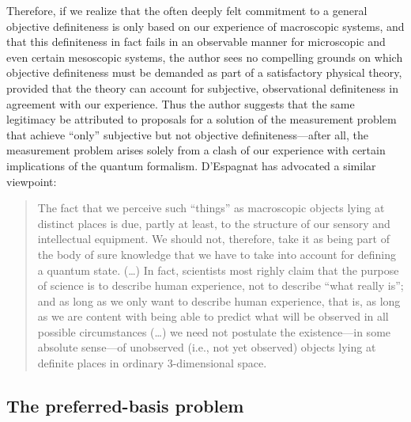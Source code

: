 \documentclass[rmp,aps,amsmath,amsfonts,noshowkeys,noshowpacs,12pt]{revtex4}
\begin{document}
Therefore, if we realize that the often deeply felt commitment to a
general objective definiteness is only based on our experience of
macroscopic systems, and that this definiteness in fact fails in an
observable manner for microscopic and even certain mesoscopic systems,
the author sees no compelling grounds on which objective definiteness
must be demanded as part of a satisfactory physical theory, provided
that the theory can account for subjective, observational definiteness
in agreement with our experience. Thus the author suggests that the
same legitimacy be attributed to proposals for a solution of the
measurement problem that achieve ``only'' subjective but not objective
definiteness---after all, the measurement problem arises solely from a
clash of our experience with certain implications of the quantum
formalism.  D'Espagnat \citeyearpar[pp.~134--135]{Espagnat:2000:uy}
has advocated a similar viewpoint:
%
\begin{quote} {\small 
    The fact that we perceive such ``things'' as macroscopic objects
    lying at distinct places is due, partly at least, to the structure
    of our sensory and intellectual equipment.  We should not,
    therefore, take it as being part of the body of sure knowledge
    that we have to take into account for defining a quantum state.
    (\dots) In fact, scientists most righly claim that the purpose of
    science is to describe human experience, not to describe ``what
    really is''; and as long as we only want to describe human
    experience, that is, as long as we are content with being able to
    predict what will be observed in all possible circumstances
    (\dots) we need not postulate the existence---in some absolute
    sense---of unobserved (i.e., not yet observed) objects lying at
    definite places in ordinary 3-dimensional space.}
\end{quote}



\subsection{The preferred-basis problem \label{sec:pbprob}}
\end{document}
